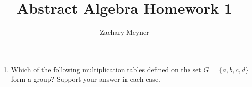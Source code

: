 \documentclass[12pt]{article}
\title{Abstract Algebra Homework 1}
\author{Zachary Meyner}
\date{}
\begin{document}
\maketitle
\begin{enumerate}
    \item Which of the following multiplication tables defined on the set $G$ = $\{a,b,c,d\}$ form a
    group? Support your answer in each case.
\end{enumerate}
\end{document}
